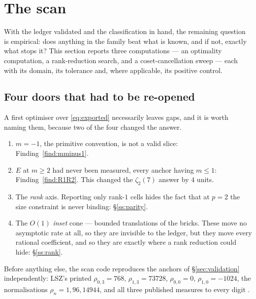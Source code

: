 \section{The scan}\label{sec:scan}

With the ledger validated and the classification in hand, the remaining question is
empirical: does anything in the family beat what is known, and if not, exactly what stops
it? This section reports three computations --- an optimality computation, a rank-reduction
search, and a coset-cancellation sweep --- each with its domain, its tolerance and, where
applicable, its positive control.

\subsection{Four doors that had to be re-opened}\label{ss:fourdoors}

A first optimiser over \eqref{eq:exported} necessarily leaves gaps, and it is worth naming
them, because two of the four changed the answer.
\begin{enumerate}[label=\textup{(\arabic*)},leftmargin=2.6em,itemsep=3pt]
\item $m=-1$, the primitive convention, is not a valid slice: Finding~\ref{find:mminus1}.
\item $E$ at $m\ge2$ had never been measured, every anchor having $m\le1$:
      Finding~\ref{find:R1R2}. This changed the $\zeta_2(7)$ answer by $4$ units.
\item The \emph{rank} axis. Reporting only rank-$1$ cells hides the fact that at $p=2$ the
      size constraint is never binding: \S\ref{ss:parity}.
\item The $O(1)$ \emph{inset} cone --- bounded translations of the bricks. These move no
      asymptotic rate at all, so they are invisible to the ledger, but they move every
      rational coefficient, and so they are exactly where a rank reduction could hide:
      \S\ref{ss:rank}.
\end{enumerate}

Before anything else, the scan code reproduces the anchors of \S\ref{sec:validation}
independently: LSZ's printed $\rho_{0,3}=768$, $\rho_{1,3}=73728$, $\rho_{0,0}=0$,
$\rho_{1,0}=-1024$, the normalisations $\rho_n=1,96,14944$, and all three published measures
to every digit .

